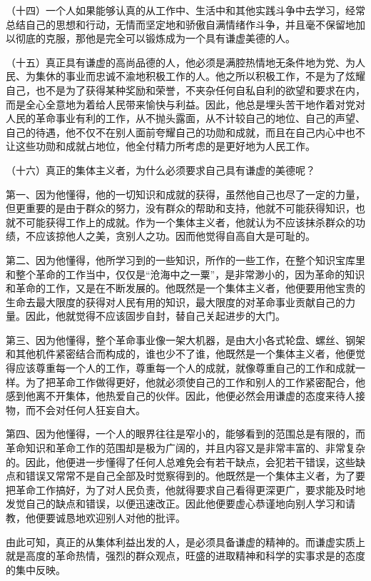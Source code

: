 （十四）一个人如果能够认真的从工作中、生活中和其他实践斗争中去学习，经常总结自己的思想和行动，无情而坚定地和骄傲自满情绪作斗争，并且毫不保留地加以彻底的克服，那他是完全可以锻炼成为一个具有谦虚美德的人。


（十五）真正具有谦虚的高尚品德的人，他必须是满腔热情地无条件地为党、为人民、为集休的事业而忠诚不渝地积极工作的人。他之所以积极工作，不是为了炫耀自己，也不是为了获得某种奖励和荣誉，不夹杂任何自私自利的欲望和要求在内，而是全心全意地为着给人民带来愉快与利益。因此，他总是埋头苦干地作着对党对人民的革命事业有利的工作，从不抛头露面，从不计较自己的地位、自己的声望、自己的待遇，他不仅不在别人面前夸耀自己的功勋和成就，而且在自己内心中也不让这些功勋和成就占地位，他全付精力所考虑的是更好地为人民工作。

（十六）真正的集体主义者，为什么必须要求自己具有谦虚的美德呢？

第一、因为他懂得，他的一切知识和成就的获得，虽然他自己也尽了一定的力量，但更重要的是由于群众的努力，没有群众的帮助和支持，他就不可能获得知识，也就不可能获得工作上的成就。作为一个集体主义者，他就认为不应该抹杀群众的功绩，不应该掠他人之美，贪别人之功。因而他觉得自高自大是可耻的。

第二、因为他懂得，他所学习到的一些知识，所作的一些工作，在整个知识宝库里和整个革命的工作当中，仅仅是“沧海中之一粟”，是非常渺小的，因为革命的知识和革命的工作，又是在不断发展的。他既然是一个集体主义者，他便要用他宝贵的生命去最大限度的获得对人民有用的知识，最大限度的对革命事业贡献自己的力量。因此，他就觉得不应该固步自封，替自己关起进步的大门。

第三、因为他懂得，整个革命事业像一架大机器，是由大小各式轮盘、螺丝、钢架和其他机件紧密结合而构成的，谁也少不了谁，他既然是一个集体主义者，他便觉得应该尊重每一个人的工作，尊重每一个人的成就，就像尊重自己的工作和成就一样。为了把革命工作做得更好，他就必须使自己的工作和别人的工作紧密配合，他感到他离不开集体，他热爱自己的伙伴。因此，他便必然会用谦虚的态度来待人接物，而不会对任何人狂妄自大。

第四、因为他懂得，一个人的眼界往往是窄小的，能够看到的范围总是有限的，而革命知识和革命工作的范围却是极为广阔的，并且内容又是非常丰富的、非常复杂的。因此，他便进一步懂得了任何人总难免会有若干缺点，会犯若干错误，这些缺点和错误又常常不是自己全部及时觉察得到的。他既然是一个集体主义者，为了要把革命工作搞好，为了对人民负责，他就得要求自己看得更深更广，要求能及时地发觉自己的缺点和错误，以便迅速改正。因此他便要虚心恭谨地向别人学习和请教，他便要诚恳地欢迎别人对他的批评。

由此可知，真正的从集体利益出发的人，是必须具备谦虚的精神的。而谦虚实质上就是高度的革命热情，强烈的群众观点，旺盛的进取精神和科学的实事求是的态度的集中反映。

